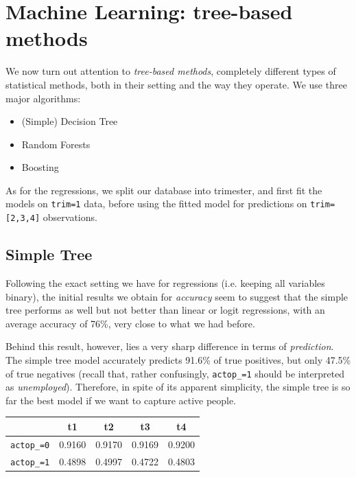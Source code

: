 \section{Machine Learning: tree-based methods}

We now turn out attention to \textit{tree-based methods}, completely different types of statistical methods, both in their setting and the way they operate. We use three major algorithms:

\begin{itemize}
    \item (Simple) Decision Tree
    \item Random Forests
    \item Boosting
\end{itemize}

As for the regressions, we split our database into trimester, and first fit the models on \texttt{trim=1} data, before using the fitted model for predictions on \texttt{trim=[2,3,4]} observations.

\subsection{Simple Tree}

Following the exact setting we have for regressions (i.e. keeping all variables binary), the initial results we obtain for \textit{accuracy} seem to suggest that the simple tree performs as well but not better than linear or logit regressions, with an average accuracy of 76\%, very close to what we had before.

Behind this result, however, lies a very sharp difference in terms of \textit{prediction}. The simple tree model accurately predicts 91.6\% of true positives, but only 47.5\% of true negatives (recall that, rather confusingly, \texttt{actop\_=1} should be interpreted as \textit{unemployed}). Therefore, in spite of its apparent simplicity, the simple tree is so far the best model if we want to capture active people.

\begin{center}
    \begin{tabular}{lcccc}
        \hline
                           & t1     & t2     & t3     & t4     \\
        \hline
        \texttt{actop\_=0} & 0.9160 & 0.9170 & 0.9169 & 0.9200 \\
        \texttt{actop\_=1} & 0.4898 & 0.4997 & 0.4722 & 0.4803 \\
    \end{tabular}
\end{center}

